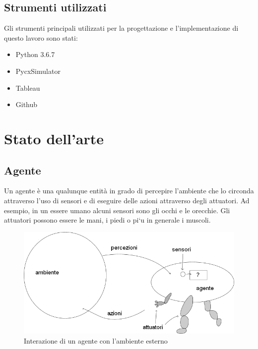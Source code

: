 \documentclass[12pt]{article}
\begin{document}
\subsection{Strumenti utilizzati}
Gli strumenti principali utilizzati per la progettazione e l'implementazione di questo lavoro sono stati:
\begin{itemize}
\item Python 3.6.7 \cite{Python}
\item PycxSimulator \cite{PycxSimulator}
\item Tableau \cite{Tableau} 
\item Github \cite{GitHub}
\end{itemize}

\newpage
\section{Stato dell'arte}

\subsection{Agente}

Un agente è una qualunque entità in grado di percepire l’ambiente che lo circonda attraverso l’uso di sensori e di eseguire delle azioni attraverso degli attuatori. Ad esempio, in un essere umano alcuni sensori sono gli occhi e le orecchie. Gli attuatori possono essere le mani, i piedi o pi`u in generale i muscoli.

\begin{figure}[ht]
\includegraphics[width=\textwidth,height=\textheight,keepaspectratio]{Figures/Vario/Agente.png}
\caption[Interazione di un agente con l'ambiente esterno]{Interazione di un agente con l'ambiente esterno}
\label{fig:Agente}
\end{figure}
\end{document}
